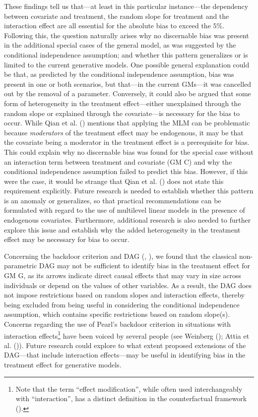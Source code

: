 \documentclass[
  11pt,
  a4paper,
]{article}
\begin{document}
These findings tell us that---at least in this particular instance---the
dependency between covariate and treatment, the random slope for
treatment and the interaction effect are all essential for the absolute
bias to exceed the \(5\%\). Following this, the question naturally
arises why no discernable bias was present in the additional special
cases of the general model, as was suggested by the conditional
independence assumption; and whether this pattern generalizes or is
limited to the current generative models. One possible general
explanation could be that, as predicted by the conditional independence
assumption, bias was present in one or both scenarios, but that---in the
current GMs---it was cancelled out by the removal of a parameter.
Conversely, it could also be argued that some form of heterogeneity in
the treatment effect---either unexplained through the random slope or
explained through the covariate---is necessary for the bias to occur.
While Qian et al. () mentions that applying
the MLM can be problematic because \emph{moderators} of the treatment
effect may be endogenous, it may be that the covariate being a moderator
in the treatment effect is a prerequisite for bias. This could explain
why no discernable bias was found for the special case without an
interaction term between treatment and covariate (GM C) and why the
conditional independence assumption failed to predict this bias.
However, if this were the case, it would be strange that Qian et al.
() does not state this requirement
explicitly. Future research is needed to establish whether this pattern
is an anomaly or generalizes, so that practical recommendations can be
formulated with regard to the use of multilevel linear models in the
presence of endogenous covariates. Furthermore, additional research is
also needed to further explore this issue and establish why the added
heterogeneity in the treatment effect may be necessary for bias to
occur.

Concerning the backdoor criterion and DAG
(, ),
we found that the classical non-parametric DAG may not be sufficient to
identify bias in the treatment effect for GM G, as its arrows indicate
direct causal effects that may vary in size across individuals or depend
on the values of other variables. As a result, the DAG does not impose
restrictions based on random slopes and interaction effects, thereby
being excluded from being useful in considering the conditional
independence assumption, which contains specific restrictions based on
random slope(s). Concerns regarding the use of Pearl's backdoor
criterion in situations with interaction effects\footnote{Note that the
  term ``effect modification'', while often used interchangeably with
  ``interaction'', has a distinct definition in the counterfactual
  framework ().} have
been voiced by several people (see Weinberg
(); Attia et al.
()). Future research could explore to what
extent proposed extensions of the DAG---that include interaction
effects---may be useful in identifying bias in the treatment effect for
generative models.
\end{document}
